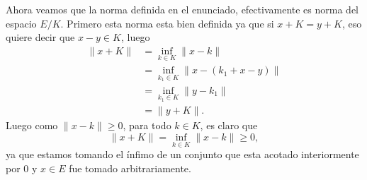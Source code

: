 \begin{itemize}
\begin{itemize}
\begin{sproof}
            Ahora veamos que la norma definida en el enunciado, efectivamente es norma del espacio $E/K.$ Primero esta norma esta bien definida ya que si $x+K=y+K$, eso quiere decir que $x-y\in K$, luego
            \begin{align*}
                 \|x+K\|&=\inf_{k\in K}\|x-k\|\\
                 &=\inf_{k_1\in K}\|x-(k_1+x-y)\|\\
                 &=\inf_{k_1\in K}\|y-k_1\|\\
                 &=\|y+K\|.
             \end{align*}
             Luego como $\|x-k\|\geq 0$, para todo $k\in K$, es claro que 
            $$\|x+K\|=\inf_{k\in K}\|x-k\|\geq 0,$$
            ya que estamos tomando el ínfimo de un conjunto que esta acotado interiormente por $0$ y $x\in E$ fue tomado arbitrariamente.\\


\end{sproof}
\end{itemize}
\end{itemize}
